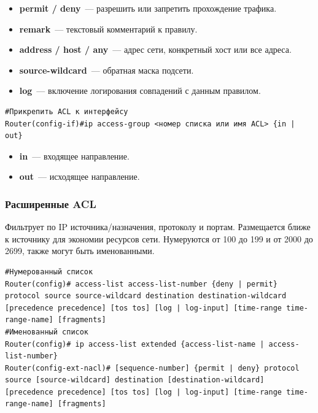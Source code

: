 	\begin{itemize}
		\item \textbf{permit / deny}~--- разрешить или запретить прохождение трафика.
		\item \textbf{remark}~--- текстовый комментарий к правилу.
		\item \textbf{address / host / any}~--- адрес сети, конкретный хост или все адреса.
		\item \textbf{source-wildcard}~--- обратная маска подсети.
		\item \textbf{log}~--- включение логирования совпадений с данным правилом.
	\end{itemize}
	
	\begin{verbatim}
#Прикрепить ACL к интерфейсу
Router(config-if)#ip access-group <номер списка или имя ACL> {in | out}
	\end{verbatim}
	
	\begin{itemize}
		\item \textbf{in}~--- входящее направление.
		\item \textbf{out}~--- исходящее направление.
		
	\end{itemize}
	
	\subsubsection*{Расширенные ACL}
	Фильтрует по IP источника/назначения, протоколу и портам. Размещается ближе к источнику для экономии ресурсов сети. Нумеруются от 100 до 199
	и от 2000 до 2699, также могут быть именованными.
	
	\begin{verbatim}
#Нумерованный список
Router(config)# access-list access-list-number {deny | permit} protocol source source-wildcard destination destination-wildcard [precedence precedence] [tos tos] [log | log-input] [time-range time-range-name] [fragments]
#Именованный список
Router(config)# ip access-list extended {access-list-name | access-list-number}
Router(config-ext-nacl)# [sequence-number] {permit | deny} protocol source [source-wildcard] destination [destination-wildcard] [precedence precedence] [tos tos] [log | log-input] [time-range time-range-name] [fragments]
	\end{verbatim}
	
